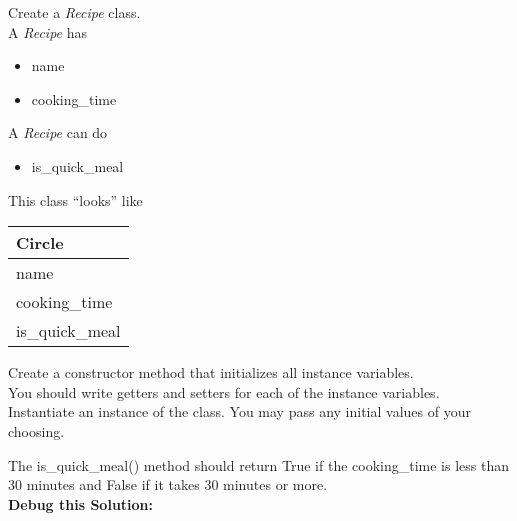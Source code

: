 \documentclass{article}
\begin{document}
\begin{enumerate}

	\begin{minipage}{.6\textwidth}
		\item Create a \textit{Recipe} class.\\
		A \textit{Recipe} has
		\begin{itemize}
			\item name 
			\item cooking\_time
		\end{itemize}

		A \textit{Recipe} can do
		\begin{itemize}
			\item is\_quick\_meal
		\end{itemize}
	\end{minipage}
	\begin{minipage}{.4\textwidth}
		This class ``looks'' like 
				
		\vspace*{1em}
		\begin{tabular}{|l|}
			\hline Circle\\ \hline
			name\\ cooking\_time \\  \hline
			is\_quick\_meal\\ \hline
		\end{tabular}
	\end{minipage}

	\vspace*{2ex}
	Create a constructor method that initializes all instance variables.\\
	You should write getters and setters for each of the instance variables.\\
	Instantiate an instance of the class. You may pass any initial values of your choosing.	

	The is\_quick\_meal() method should return True if the cooking\_time is less than 30 minutes and False 
	if it takes 30 minutes or more.\\
		
		\textbf{Debug this Solution:}\\
		\mbox{ \hspace*{0.25in}	}


\end{enumerate}
\end{document}
